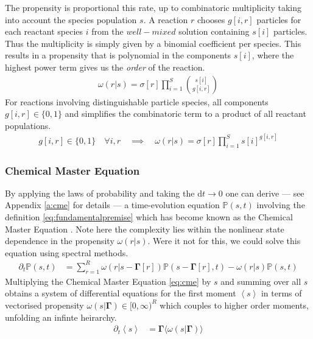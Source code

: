 \documentclass{article}[12pt]
\numberwithin{equation}{section}
\begin{document}
The propensity is proportional this rate, up to combinatoric multiplicity
taking into account the species population $s$. A reaction $r$ chooses $g[i,r]$
particles for each reactant species $i$ from the $well-mixed$ solution containing
$s[i]$ particles. Thus the multiplicity is simply given by a binomial coefficient
per species. This results in a propensity that is polynomial in the components
$s[i]$, where the highest power term gives us the \textit{order} of the reaction.
\begin{align}
	\omega(r|s)=
	\sigma[r]
		\prod_{i=1}^S{s[i] \choose g[i,r]}
	\label{eq:propensity}
\end{align}
For reactions involving distinguishable particle species, all
components $ g[i,r]\in\{ 0,1\}$ and simplifies the combinatoric term to a
product of all reactant populations.
\begin{align}
	g[i,r]\in\{ 0,1\}\quad\forall i,r\quad\implies\quad
	\omega(r|s)=
	\sigma[r]
	\prod_{i=1}^S s[i]^{g[i,r]}
	\label{eq:simplifiedpropensity}
\end{align}
\subsubsection{Chemical Master Equation}\vspace{-10pt}
By applying the laws of probability and taking the $\mathrm{d}t\rightarrow 0$
one can derive --- see Appendix \ref{a:cme} for details --- a time-evolution equation
$\mathbb{P}(s,t)$ involving the definition \eqref{eq:fundamentalpremise} which
has become known as the Chemical Master Equation \cite{Gillespie1992,Gillespie2007}.
Note here the complexity lies within the nonlinear state dependence in the propensity
$\omega(r|s)$. Were it not for this, we could solve this equation using
spectral methods.
\begin{align}
	\partial_t\mathbb{P}(s,t) &=
	\sum_{r=1}^R
	\omega(r|s-\mathbf{\Gamma}[r])\mathbb{P}(s-\mathbf{\Gamma}[r],t)-\omega(r|s)\mathbb{P}(s,t)
	\label{eq:cme}
\end{align}
Multiplying the Chemical Master Equation \eqref{eq:cme} by $s$ and summing over all $s$
obtains a system of differential equations for the first moment
$\left\langle s \right\rangle$ in terms of vectorised propensity
$\omega(s|\mathbf{\Gamma})\in[0,\infty)^R$ which couples to higher order moments,
unfolding an infinte heirarchy.
\begin{align}
	\partial_t
	\left\langle s \right\rangle &=
	\mathbf{\Gamma} \big\langle \omega(s|\mathbf{\Gamma}) \big\rangle
	\label{eq:momentheirarchy}
\end{align}
\end{document}
